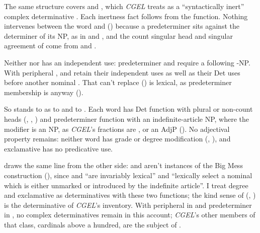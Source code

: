 \documentclass[12pt]{article}
\begin{document}
The same structure covers  and , which \textit{CGEL} treats as a \enquote{syntactically inert} complex determinative \citep[394]{huddleston2002}. Each inertness fact follows from the function. Nothing intervenes between the word and  () because a predeterminer sits against the determiner of its NP, as in  and , and the count singular head and singular agreement of  come from  and .

Neither  nor  has an independent use: predeterminer  and  require a following -NP. With peripheral ,  and  retain their independent uses as well as their Det uses before another nominal \citep[394]{huddleston2002}. That  can't replace  () is lexical, as predeterminer membership is anyway ().

So  stands to  as  to  and  to . Each word has Det function with plural or non-count heads (, , ) and predeterminer function with an indefinite-article NP, where the modifier is an NP, as \textit{CGEL}'s fractions are \citep[385 n.~25]{huddleston2002}, or an AdjP (). No adjectival property remains: neither word has grade or degree modification (, ), and exclamative  has no predicative use.

\textcite[§5]{VanEynde_2007_BigMess} draws the same line from the other side:  and  aren't instances of the Big Mess construction (), since  and  \enquote{are invariably lexical} and \enquote{lexically select a nominal which is either unmarked or introduced by the indefinite article}. I treat degree  and exclamative  as determinatives with these two functions; the kind sense of  (, ) is the determinative  of \textit{CGEL}'s inventory. With peripheral  in  and predeterminer  in , no complex determinatives remain in this account; \textit{CGEL}'s other members of that class, cardinals above a hundred, are the subject of \textcite{reynolds2026numerals}.
\end{document}
